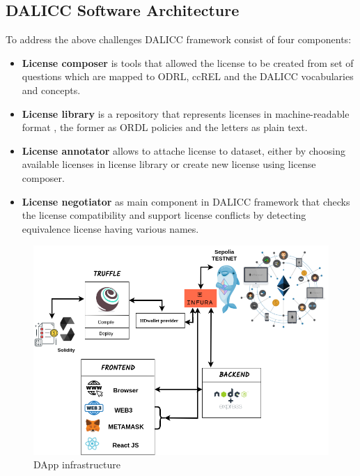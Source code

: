 \subsection{DALICC Software Architecture}
To address the above challenges DALICC framework consist of four components:\\
\begin{itemize}
	\item \textbf{License composer} is tools that allowed the license to be created from set of questions which are mapped to ODRL, ccREL and the DALICC vocabularies and concepts.
	\item \textbf{License library} is a repository that represents licenses in machine-readable format , the former as ORDL policies and the letters as plain text.
	\item \textbf{License annotator} allows to attache license to dataset, either by choosing available licenses in license library or create new license using license composer.
	\item \textbf{License negotiator} as main component in DALICC framework that checks the license compatibility and support license conflicts by detecting equivalence license having various names.
\end{itemize}
\begin{center}
	
	\begin{figure}[htb!]
		
		\begin{minipage}{0.75\linewidth}
			
			\includegraphics[width=1.45\textwidth]{images/chap03_dapp.png}
		\end{minipage}
		\caption{DApp infrastructure}
		
	\end{figure}
	
\end{center}

